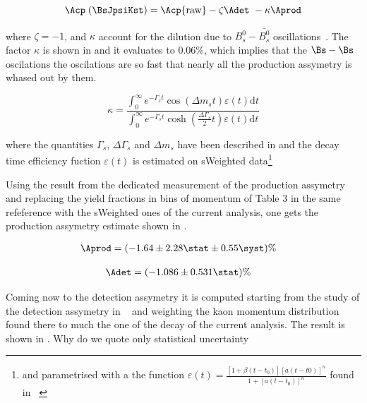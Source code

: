 \begin{equation}
\Acp\;(\BsJpsiKst) = \Acp{\rm raw} - \zeta \Adet\ - \kappa\Aprod
\label{acp_corrected}
\end{equation}

\noindent where $\zeta = -1$, and $\kappa$ account for the dilution due to $B^0_s-\bar{B^0_s}$ 
oscillations~\cite{LHCb-PAPER-2013-018}. The factor $\kappa$ is shown in  and it evaluates to $0.06\%$, 
which implies that the $\Bs-\Bs$ oscilations the oscilations are so fast that nearly all the production assymetry
is whased out by them.

\begin{equation}
 \kappa = \frac{\int_0^\infty  e^{-\Gamma_s t} \cos \!\left( \Delta m_s t \right ) \varepsilon(t)\mathrm{d}t}{\int_0^\infty  e^{-\Gamma_s t} \cosh \left( \frac{\Delta \Gamma_s}{2} t \right ) \varepsilon(t)\mathrm{d}t}
\label{kappa}
\end{equation}

\noindent where the quantities $\Gamma_s$, $\Delta\Gamma_s$ and $\Delta m_s$ have been described in 
and the decay time efficiency fuction $\varepsilon(t)$ is estimated on sWeighted \BsJpsiKst 
data\footnote{and parametrised with a the function $\varepsilon(t)= \frac{[1+\beta(t-t_0)][a(t-t0)]^n}{1+[a(t-t_0)]^n}$ found in ~\cite{LHCb-PAPER-2014-053}}

Using the result from the dedicated \lhcb measurement of the production assymetry ~\cite{LHCb-PAPER-2014-042}
and replacing the yield fractions in bins of \Bs momentum of Table 3 in the same refeference with the sWeighted \BsJpsiKst ones of the current analysis, 
one gets the production assymetry estimate shown in .

\begin{align}
\Aprod &= (-1.64 \pm 2.28 \stat \pm 0.55 \syst)\%
\label{prod_assym}
\end{align}

\begin{align}
\Adet &= (-1.086 \pm 0.531 \stat)\%
\label{det_assym}
\end{align}
 
\noindent Coming now to the detection assymetry it is computed starting from the \lhcb study of the detection assymetry
in ~\cite{LHCb-PAPER-2014-013} and weighting the kaon momentum distribution found there to much the one of the \BsJpsiKst
decay of the current analysis. The result is shown in . {\color{red} Why do we quote only statistical uncertainty}




